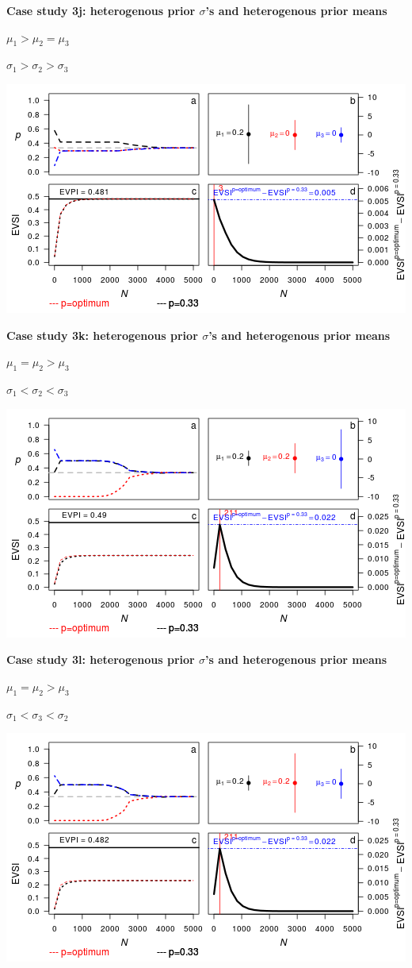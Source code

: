 \textbf{Case study 3j: heterogenous prior \(\sigma\)'s and heterogenous
prior means}

\(\mu_1 > \mu_2 = \mu_3\)

\(\sigma_1 > \sigma_2 > \sigma_3\)

\includegraphics{figure/x100___1__1_1c-1.png} \clearpage

\textbf{Case study 3k: heterogenous prior \(\sigma\)'s and heterogenous
prior means}

\(\mu_1 = \mu_2 > \mu_3\)

\(\sigma_1 < \sigma_2 < \sigma_3\)

\includegraphics{figure/x110_1__1___1c-1.png} \clearpage

\textbf{Case study 3l: heterogenous prior \(\sigma\)'s and heterogenous
prior means}

\(\mu_1 = \mu_2 > \mu_3\)

\(\sigma_1 < \sigma_3 < \sigma_2\)

\includegraphics{figure/x110_1___1__1c-1.png} \clearpage  

